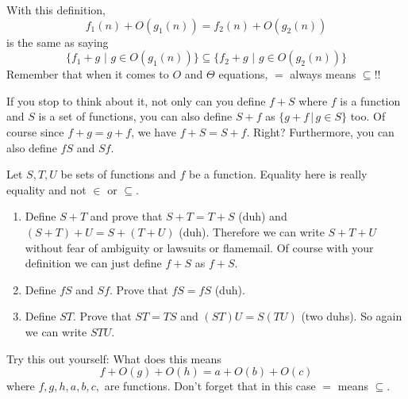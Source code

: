 With this definition,
\[
 f_1(n) + O(g_1(n)) = f_2(n) + O(g_2(n))
\]
is the same as saying
\[
 \biggl\{ f_1 + g \,\,\biggl|\,\, g \in O(g_1(n)) \biggr\}
 \subseteq
 \biggl\{ f_2 + g \,\,\biggl|\,\, g \in O(g_2(n)) \biggr\}
\]
Remember that when it comes to $O$ and $\Theta$ equations, $=$
always means $\subseteq$!!


If you stop to think about it, not only can you define $f + S$
where $f$ is a function and $S$ is a set of functions, you can
also define $S + f$ as $\{ g + f \,|\, g \in S \}$ too. Of course
since $f+g = g + f$, we have $f + S = S + f$. Right? Furthermore,
you can also define $fS$ and $Sf$.


\begin{ex}
Let $S, T, U$ be sets of functions and $f$ be a function. Equality
here is really equality and not $\in$ or $\subseteq$.
\begin{enumerate}
 \item Define $S + T$ and prove that $S + T = T + S$ (duh) and
 $(S+T)+U = S+(T+U)$ (duh).
 Therefore we can write $S+T+U$ without fear of ambiguity or
 lawsuits or flamemail. Of course with your definition we can just
 define $f+S$ as ${f} + S$.
 \item Define $fS$ and $Sf$. Prove that $fS = fS$ (duh).
 \item Define $ST$. Prove that $ST = TS$ and $(ST)U = S(TU)$
 (two duhs). So again we can write $STU$.
\end{enumerate}
\end{ex}


\begin{ex}
Try this out yourself: What does this means
\[
 f + O(g) + O(h) = a + O(b) + O(c)
\]
where $f,g,h,a,b,c,$ are functions. Don't forget that in this case
$=$ means $\subseteq$.\end{ex}

